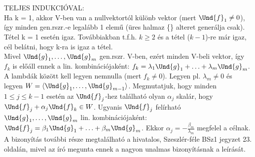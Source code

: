 
\begin{bizonyitas}{}
TELJES INDUKCIÓVAL:\\
Ha k = 1, akkor V-ben van a nullvektortól különb vektor (mert $\Und{f}_{1} \neq 0$), így minden gen.rszr.-e legalább 1 elemű (üres halmaz \{\} alteret generálja csak). Tétel k = 1 esetén igaz. Továbbiakban t.f.h. $k \geq 2$ és a tétel ($k - 1$)-re már igaz, cél belátni, hogy k-ra is igaz a tétel.\\
Mivel $\Und{g}_1,\ldots,\Und{g}_m$ gen.rszr. V-ben, ezért minden V-beli vektor, így $f_k$ is előáll ennek a lin. kombinációjaként: $f_k = \lambda_1\Und{g}_1 + \ldots + \lambda_m\Und{g}_m$. A lambdák között kell legyen nemnulla (mert $f_k \neq 0$). Legyen pl. $\lambda_m \neq 0$ és legyen $W = \langle \Und{g}_1, \ldots, \Und{g}_{m-1} \rangle$. Megmutatjuk, hogy minden $1 \leq j \leq k-1$ esetén az $\Und{f}_j$-hez található olyan $\alpha_j$ skalár, hogy $\Und{f}_j + \alpha_j\Und{f}_k \in W$. Ugyanis $\Und{f}_j$ felírható $\Und{g}_1,\ldots,\Und{g}_m$ lin. kombinációjaként: $\Und{f}_j = \beta_1\Und{g}_1+\ldots+\beta_m\Und{g}_m$. Ekkor $\alpha_j = -\frac{\beta_m}{\lambda_m}$ megfelel a célnak. A bizonyítás további része megtalálható a hivatalos, Szeszlér-féle BSz1 jegyzet 23. oldalán, mivel az író megunta ennek a nagyon unalmas bizonyításnak a leírását.
\end{bizonyitas}

